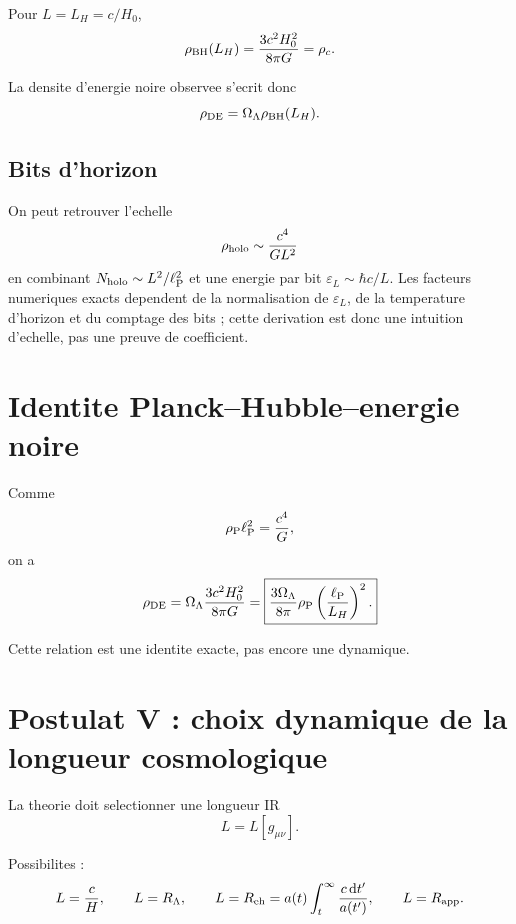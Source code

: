 \documentclass[11pt,a4paper]{article}
\newcommand{\lp}{\ell_{\rm P}}
\newcommand{\rp}{\rho_{\rm P}}
\newcommand{\rhc}{\rho_c}
\newcommand{\RL}{R_\Lambda}
\newcommand{\LH}{L_H}
\newcommand{\dif}{\mathrm d}
\begin{document}
Pour \(L=\LH=c/H_0\),
\begin{equation}
\rho_{\rm BH}(\LH)=\frac{3c^2H_0^2}{8\pi G}=\rhc.
\end{equation}

La densite d'energie noire observee s'ecrit donc
\begin{equation}
\rho_{\rm DE}=\Omega_\Lambda\rho_{\rm BH}(\LH).
\end{equation}

\subsection{Bits d'horizon}

On peut retrouver l'echelle
\begin{equation}
\rho_{\rm holo}\sim\frac{c^4}{GL^2}
\end{equation}
en combinant \(N_{\rm holo}\sim L^2/\lp^2\) et une energie par bit
\(\varepsilon_L\sim\hbar c/L\). Les facteurs numeriques exacts dependent de la
normalisation de \(\varepsilon_L\), de la temperature d'horizon et du comptage
des bits ; cette derivation est donc une intuition d'echelle, pas une preuve de
coefficient.

\section{Identite Planck--Hubble--energie noire}

Comme
\begin{equation}
\rp\lp^2=\frac{c^4}{G},
\end{equation}
on a
\begin{equation}
\rho_{\rm DE}
=\Omega_\Lambda\frac{3c^2H_0^2}{8\pi G}
=\boxed{
\frac{3\Omega_\Lambda}{8\pi}\rp\left(\frac{\lp}{\LH}\right)^2.
}
\end{equation}

Cette relation est une identite exacte, pas encore une dynamique.

\section{Postulat V : choix dynamique de la longueur cosmologique}

La theorie doit selectionner une longueur IR
\begin{equation}
L=L[g_{\mu\nu}].
\end{equation}

Possibilites :
\begin{equation}
L=\frac{c}{H},
\qquad
L=\RL,
\qquad
L=R_{\rm eh}=a(t)\int_t^\infty\frac{c\,\dif t'}{a(t')},
\qquad
L=R_{\rm app}.
\end{equation}
\end{document}
